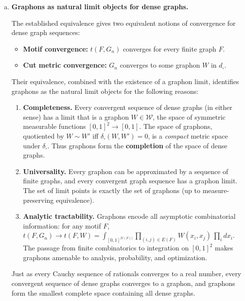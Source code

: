 \documentclass{article}
\begin{document}
\begin{tcolorbox}[colback=white, colframe=black!70, title=\textbf{Solution to Exercise 3}, breakable]
\begin{enumerate}[(a)]
\item \textbf{Graphons as natural limit objects for dense graphs.}

The established equivalence gives two equivalent notions of convergence for dense graph sequences:
\begin{itemize}
    \item \textbf{Motif convergence:} $t(F, G_n)$ converges for every finite graph $F$.
    \item \textbf{Cut metric convergence:} $G_n$ converges to some graphon $W$ in $d_\square$.
\end{itemize}

Their equivalence, combined with the existence of a graphon limit, identifies graphons as the natural limit objects for the following reasons:

\begin{enumerate}[\normalfont 1.]
    \item \textbf{Completeness.} Every convergent sequence of dense graphs (in either sense) has a limit that is a graphon $W \in \mathcal W$, the space of symmetric measurable functions $[0,1]^2 \to [0,1]$. The space of graphons, quotiented by $W \sim W'$ iff $\delta_\square(W,W') = 0$, is a \emph{compact} metric space under $\delta_\square$. Thus graphons form the \textbf{completion} of the space of dense graphs.

    \item \textbf{Universality.} Every graphon can be approximated by a sequence of finite graphs, and every convergent graph sequence has a graphon limit. The set of limit points is exactly the set of graphons (up to measure-preserving equivalence).

    \item \textbf{Analytic tractability.} Graphons encode all asymptotic combinatorial information: for any motif $F$, $t(F, G_n) \to t(F, W) = \int_{[0,1]^{|V(F)|}} \prod_{(i,j)\in E(F)} W(x_i, x_j) \, \prod_i dx_i$. The passage from finite combinatorics to integration on $[0,1]^2$ makes graphons amenable to analysis, probability, and optimization.
\end{enumerate}


Just as every Cauchy sequence of rationals converges to a real number, every convergent sequence of dense graphs converges to a graphon, and graphons form the smallest complete space containing all dense graphs.

\end{enumerate}
\end{tcolorbox}
\end{document}
